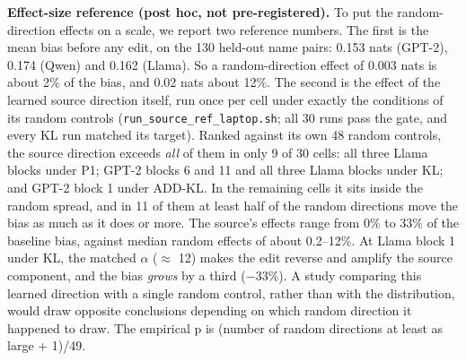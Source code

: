 \documentclass[
  10pt,
]{article}
\begin{document}
\textbf{Effect-size reference (post hoc, not pre-registered).} To put
the random-direction effects on a scale, we report two reference
numbers. The first is the mean \textbar bias\textbar{} before any edit,
on the 130 held-out name pairs: 0.153 nats (GPT-2), 0.174 (Qwen) and
0.162 (Llama). So a random-direction effect of 0.003 nats is about 2\%
of the bias, and 0.02 nats about 12\%. The second is the effect of the
learned source direction itself, run once per cell under exactly the
conditions of its random controls (\texttt{run\_source\_ref\_laptop.sh};
all 30 runs pass the gate, and every KL run matched its target). Ranked
against its own 48 random controls, the source direction exceeds
\emph{all} of them in only 9 of 30 cells: all three Llama blocks under
P1; GPT-2 blocks 6 and 11 and all three Llama blocks under KL; and GPT-2
block 1 under ADD-KL. In the remaining cells it sits inside the random
spread, and in 11 of them at least half of the random directions move
the bias as much as it does or more. The source's effects range from 0\%
to 33\% of the baseline bias, against median random effects of about
0.2--12\%. At Llama block 1 under KL, the matched $\alpha$ ($\approx$ 12) makes the
edit reverse and amplify the source component, and the bias \emph{grows}
by a third ($-$33\%). A study comparing this learned direction with a
single random control, rather than with the distribution, would draw
opposite conclusions depending on which random direction it happened to
draw. The empirical p is (number of random directions at least as large
+ 1)/49.
\end{document}
